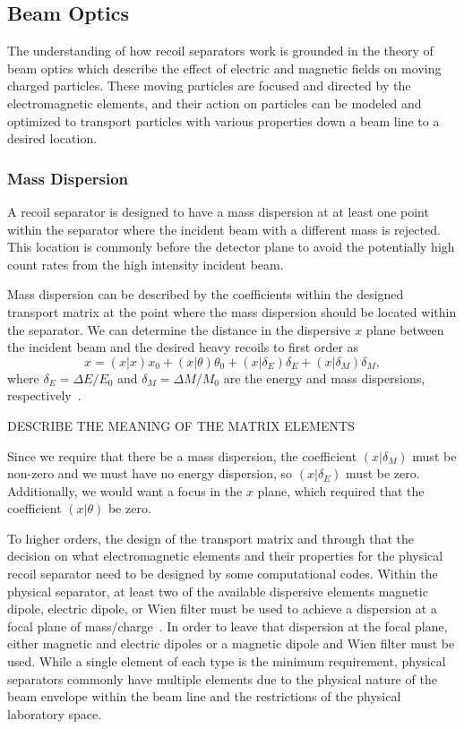 \subsection{Beam Optics}

The understanding of how recoil separators work is grounded in the
theory of beam optics which describe the effect of electric and magnetic
fields on moving charged particles. These moving particles are focused
and directed by the electromagnetic elements, and their action on
particles can be modeled and optimized to transport particles with
various properties down a beam line to a desired location.

\subsubsection{Mass Dispersion}
A recoil separator is designed to have a mass dispersion at at least one
point within the separator where the incident beam with a different mass
is rejected. This location is commonly before the detector plane to
avoid the potentially high count rates from the high intensity incident
beam.

Mass dispersion can be described by the coefficients within the designed
transport matrix at the point where the mass dispersion should be
located within the separator. We can determine the distance in the
dispersive $x$ plane between the incident beam and the desired heavy
recoils to first order as
\[
    x = (x|x)x_0 + (x|\theta)\theta_0 + (x|\delta_E)\delta_E + (x|\delta_M)\delta_M,
\]
where $\delta_E = \Delta E/E_0$ and $\delta_M = \Delta M/M_0$ are the
energy and mass dispersions, respectively~\cite{Davids2003}.

DESCRIBE THE MEANING OF THE MATRIX ELEMENTS

Since we
require that there be a mass dispersion, the coefficient $(x|\delta_M)$
must be non-zero and we must have no energy dispersion, so
$(x|\delta_E)$ must be zero. Additionally, we would want a focus in the
$x$ plane, which required that the coefficient $(x|\theta)$ be zero.

To higher orders, the design of the transport matrix and through that
the decision on what electromagnetic elements and their properties for
the physical recoil separator need to be designed by some computational
codes. Within the physical separator, at least two of the available
dispersive elements magnetic dipole, electric dipole, or Wien filter
must be used to achieve a dispersion at a focal plane of
mass/charge~\cite{Davids2003}. In order to leave that dispersion at the
focal plane, either magnetic and electric dipoles or a magnetic dipole
and Wien filter must be used. While a single element of each type is the
minimum requirement, physical separators commonly have multiple elements
due to the physical nature of the beam envelope within the beam line and
the restrictions of the physical laboratory space.

